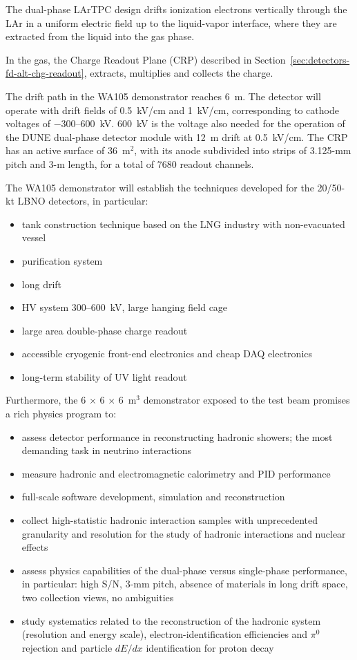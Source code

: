 {The dual-phase LArTPC design drifts ionization electrons
vertically through the LAr in a uniform electric field up to the
liquid-vapor interface, where they are extracted from the liquid into
the gas phase.

In the gas, the Charge Readout Plane (CRP) described in
Section~\ref{sec:detectors-fd-alt-chg-readout}, 
extracts, multiplies and collects the charge. 

The drift path in the WA105 demonstrator reaches 6~m. The detector
will operate with drift fields of 0.5~kV/cm and 1~kV/cm, corresponding
to cathode voltages of $-$300--600~kV. 600~kV is the voltage also
needed for the operation of the DUNE dual-phase detector module with 12~m drift at
0.5~kV/cm. The CRP has an active surface of 36~m$^2$, with its anode subdivided into
strips of 3.125-mm pitch and 3-m length, for a total of \num{7680}
readout channels.

The WA105 demonstrator will establish the techniques developed for
the 20/50-kt LBNO detectors, in particular:
\begin{itemize}
\item{tank construction technique based on the LNG industry with non-evacuated vessel}
\item{purification system}
\item{long drift}
\item{HV system 300--600~kV, large hanging field cage}
\item{large area double-phase charge readout}
\item{accessible cryogenic front-end electronics and cheap DAQ electronics}
\item{long-term stability of UV light readout}
\end{itemize}

Furthermore, the 6 $\times$ 6 $\times$ 6~m$^3$ demonstrator exposed to the
test beam promises a rich physics program to:
\begin{itemize}
\item{assess detector performance in reconstructing hadronic showers; the most demanding task in neutrino interactions}
\item{measure hadronic and electromagnetic calorimetry and PID performance}
\item{full-scale software development, simulation and reconstruction}
\item{collect high-statistic hadronic interaction samples with unprecedented granularity and resolution for the study of hadronic interactions and nuclear effects}
\item{assess physics capabilities of the dual-phase versus
  single-phase performance, in particular: high S/N, 3-mm pitch,
  absence of materials in long drift space, two collection views, no
  ambiguities}
\item{study systematics related to
  the reconstruction of the hadronic system (resolution and energy
  scale), electron-identification efficiencies and $\pi^0$ rejection and particle $dE/dx$ identification for proton decay}
\end{itemize}



}
